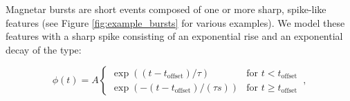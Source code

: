 \documentclass[12pt]{emulateapj}
\newcommand{\word}{\phi}
\begin{document}
Magnetar bursts are short events composed of one or more sharp, spike-like features (see Figure \ref{fig:example_bursts} for various examples). We model these features
with a sharp spike consisting of an exponential rise and an exponential decay of the type:



\begin{equation}
\word(t) = A \left\{\begin{array}{ll}\exp((t-t_{\mathrm{offset}})/\tau) & \mbox{for $t < t_{\mathrm{offset}}$}\\ 
\exp(-(t-t_{\mathrm{offset}})/(\tau s)) & \mbox{for $t \geq t_\mathrm{offset}$}\end{array}\right. \, ,
\label{eqn:word}
\end{equation}
\end{document}
